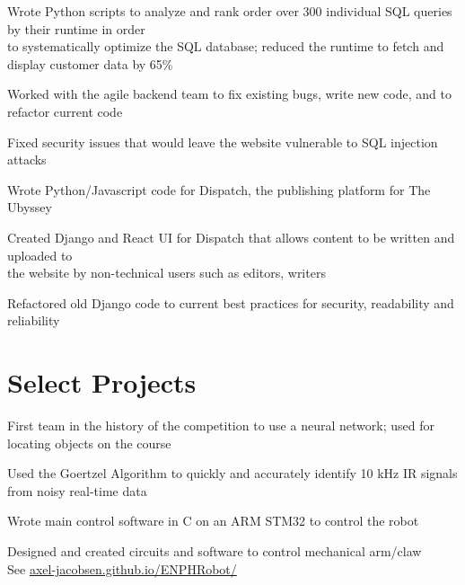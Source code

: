 \documentclass[]{deedy-resume-openfont}
\begin{document}
\begin{tightemize}
	\item Wrote Python scripts to analyze and rank order over 300 individual SQL queries by their runtime in order \\ to systematically optimize the SQL database; reduced the runtime to fetch and display customer data by 65\%
	\item Worked with the agile backend team to fix existing bugs, write new code, and to refactor current code
	\item Fixed security issues that would leave the website vulnerable to SQL injection attacks
\end{tightemize}
\vspace{8pt}

\begin{tightemize}
	\item Wrote Python/Javascript code for Dispatch, the publishing platform for The Ubyssey
	\item Created Django and React UI for Dispatch that allows content to be written and uploaded to \\ the website by non-technical users such as editors, writers
	\item Refactored old Django code to current best practices for security, readability and reliability
\end{tightemize}
\vspace{10pt}


\section{Select Projects}

\begin{tightemize}
	\item First team in the history of the competition to use a neural network; used for locating objects on the course
	\item Used the Goertzel Algorithm to quickly and accurately identify 10 kHz IR signals from noisy real-time data
	\item Wrote main control software in C on an ARM STM32 to control the robot
	\item Designed and created circuits and software to control mechanical arm/claw \\
	See \href{https://axel-jacobsen.github.io/ENPHRobot/}{axel-jacobsen.github.io/ENPHRobot/}
\end{tightemize}
\vspace{8pt}
\end{document}
